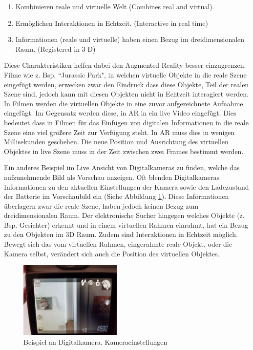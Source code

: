 \begin{enumerate}
	\item Kombinieren reale und virtuelle Welt (Combines real and virtual).
	\item Ermöglichen Interaktionen in Echtzeit. (Interactive in real time)
	\item Informationen (reale und virtuelle) haben einen Bezug im dreidimensionalen Raum. (Registered in 3-D)
\end{enumerate}

Diese Charakteristiken helfen dabei den Augmented Reality besser einzugrenzen. \cite{Azuma.1997} Filme wie z. Bsp. ``Jurassic Park", in welchen virtuelle Objekte in die reale Szene eingefügt werden, 
erwecken zwar den Eindruck dass diese Objekte, Teil der realen Szene sind, jedoch kann mit diesen Objekten nicht in Echtzeit interagiert werden. \cite{Tonnis2010} In Filmen werden die virtuellen Objekte in eine zuvor aufgezeichnete Aufnahme eingefügt. 
Im Gegensatz werden diese, in AR in ein live Video eingefügt. Dies bedeutet dass in  Filmen für das Einfügen von digitalen Informationen in die reale Szene eine viel größere Zeit zur Verfügung steht. In AR muss dies in wenigen Millisekunden geschehen. 
Die neue Position und Ausrichtung des virtuellen Objektes in live Szene muss in der Zeit zwischen zwei Frames bestimmt werden.

Ein anderes Beispiel im Live Ansicht von Digitalkameras zu finden, welche das aufzunehmende Bild als Vorschau anzeigen. Oft blenden Digitalkameras Informationen zu den aktuellen Einstellungen der Kamera sowie den Ladezustand der Batterie im Vorschaubild ein (Siehe Abbildung \ref{img:ar_camera_example}).  
Diese Informationen überlagern zwar die reale Szene, haben jedoch keinen Bezug zum dreidimensionalen Raum. Der elektronische Sucher hingegen welches Objekte (z. Bsp. Gesichter) erkennt und in einem virtuellen Rahmen einrahmt, hat ein Bezug zu den Objekten im 3D Raum. Zudem sind Interaktionen in Echtzeit möglich. Bewegt sich das vom virtuellen Rahmen, eingerahmte reale Objekt, oder die Kamera selbst, verändert sich auch die Position des virtuellen Objektes. 

\begin{figure}[H]
	\centering
	\includegraphics[width=0.45\textwidth]{resources/fundamentals/example_camera_screen_ar}
	\caption{Beispiel an Digitalkamera. Kameraeinstellungen \cite{example_ar_camera}}
	\label{img:ar_camera_example}
\end{figure}

